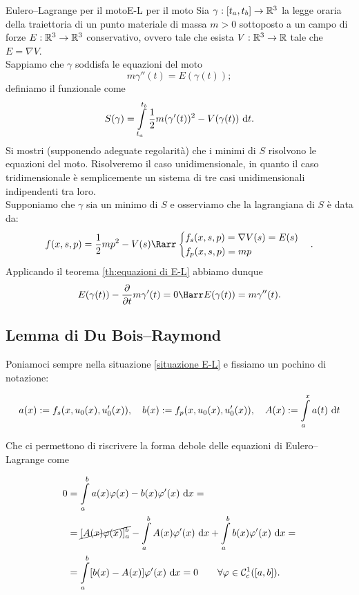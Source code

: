 \documentclass[openany]{book}
\begin{document}
\begin{exercise}{Eulero--Lagrange per il moto}{E-L per il moto}
    Sia $\gamma : [t_a,t_b]\to \mathbb{R}^3$ la legge oraria della traiettoria di un punto materiale di massa $m>0$ sottoposto a un campo di forze $E : \mathbb{R}^3 \to \mathbb{R}^3$ conservativo, ovvero tale che esista $V : \mathbb{R}^3\to \mathbb{R}$ tale che $E = \nabla V$.\\ Sappiamo che $\gamma$ soddisfa le equazioni del moto
    \[ m \gamma''(t) = E(\gamma(t)); \]
    definiamo il funzionale  come
    \[S(\gamma) = \intop_{t_a}^{t_b} \frac{1}{2} m (\gamma'(t))^2 - V(\gamma(t)) \de t .\]
    Si mostri (supponendo adeguate regolarità) che i minimi di $S$ risolvono le equazioni del moto.
    \solution 
    Risolveremo il caso unidimensionale, in quanto il caso tridimensionale è semplicemente un sistema di tre casi unidimensionali indipendenti tra loro.\\
    Supponiamo che $\gamma$ sia un minimo di $S$ e osserviamo che la lagrangiana di $S$ è data da:
    \[ f(x,s,p) = \frac{1}{2}m p^2 - V(s) \Rarr\begin{cases} f_s(x,s,p) = \nabla V(s) = E(s) \\ f_p(x,s,p)= m p\end{cases}. \]
    Applicando il teorema \ref{th:equazioni di E-L} abbiamo dunque 
    \[ E(\gamma(t)) - \frac{\partial}{\partial t} m \gamma'(t) = 0 \Harr E(\gamma(t)) = m \gamma''(t). \]
    \solved
\end{exercise}


\subsection{Lemma di Du Bois--Raymond}

Poniamoci sempre nella situazione \ref{situazione E-L} e fissiamo un pochino di notazione:

\[a(x) := f_s(x, u_0(x), u_0'(x)), \quad b(x) := f_p(x, u_0(x), u_0'(x)), \quad A(x) := \intop_a^x a(t)\de t \]

Che ci permettono di riscrivere la forma debole delle equazioni di Eulero--Lagrange come

\[\begin{aligned}
    0 & = \intop_a^b a(x)\varphi(x) - b(x)\varphi'(x)\de x = \\ & = \cancel{[A(x)\varphi(x)]_a^b} - \intop_a^b A(x)\varphi'(x) \de x + \intop_a^b b(x)\varphi'(x) \de x = \\ & = \intop_a^b [b(x)-A(x)]\varphi'(x) \de x = 0 \qquad \forall \varphi \in \mc{C}_c^1([a,b]).
\end{aligned}\]
\end{document}
